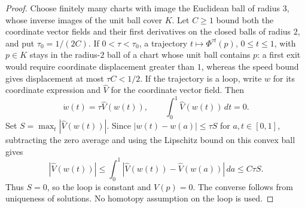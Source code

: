 \begin{proof}
Choose finitely many charts with image the Euclidean ball of radius
$3$, whose inverse images of the unit ball cover $K$. Let $C\ge1$
bound both the coordinate vector fields and their first derivatives
on the closed balls of radius $2$, and put $\tau_0=1/(2C)$.
If $0<\tau<\tau_0$, a trajectory
$t\mapsto\Phi^{\tau t}(p)$, $0\le t\le1$, with $p\in K$ stays
in the radius-$2$ ball of a chart whose unit ball contains $p$:
a first exit would require coordinate displacement greater than $1$,
whereas the speed bound gives displacement at most $\tau C<1/2$.
If the trajectory is a loop, write $w$ for its coordinate expression
and $\widehat V$ for the coordinate vector field. Then
\[
 \dot w(t)=\tau\widehat V(w(t)),\qquad
 \int_0^1\widehat V(w(t))\,dt=0.
\]
Set $S=\max_t|\widehat V(w(t))|$. Since
$|w(t)-w(a)|\le\tau S$ for $a,t\in[0,1]$, subtracting the zero
average and using the Lipschitz bound on this convex ball gives
\[
 |\widehat V(w(t))|
 \le\int_0^1|\widehat V(w(t))-\widehat V(w(a))|\,da
 \le C\tau S.
\]
Thus $S=0$, so the loop is constant and $V(p)=0$. The converse follows
from uniqueness of solutions. No homotopy assumption on the loop is used.
\end{proof}

